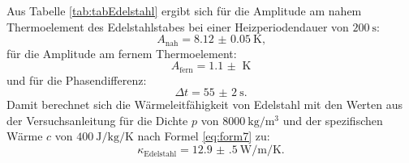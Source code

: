 Aus Tabelle \ref{tab:tabEdelstahl} ergibt sich für die Amplitude am nahem Thermoelement des Edelstahlstabes bei einer Heizperiodendauer von $\SI{200}{\second}$:
\begin{displaymath}
A_\text{nah} = \SI{8.12(5)}{\kelvin}\text{,}
\end{displaymath}
für die Amplitude am fernem Thermoelement:
\begin{displaymath}
A_\text{fern} = \SI{1.1(0)}{\kelvin}
\end{displaymath}
und für die Phasendifferenz:
\begin{displaymath}
\Delta t = \SI{55(2)}{\second}\text{.}
\end{displaymath}
Damit berechnet sich die Wärmeleitfähigkeit von Edelstahl mit den Werten aus der Versuchsanleitung \cite{V204} für die Dichte $p$ von $\SI{8000}{\kilo\gram\per\meter\tothe{3}}$ und der spezifischen Wärme $c$ von $\SI{400}{\joule\per\kilo\gram\per\kelvin}$ nach Formel \eqref{eq:form7} zu:
\begin{displaymath}
\kappa_\text{Edelstahl} = \SI{12.9(5)}{\watt\per\meter\per\kelvin}\text{.}
\end{displaymath}
